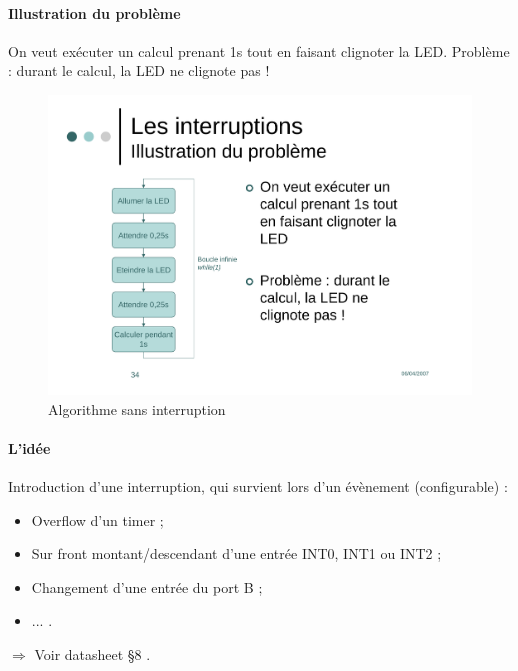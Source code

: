 \documentclass[a4paper]{article}
\begin{document}
\paragraph{Illustration du problème}

On veut exécuter un calcul prenant 1s tout en faisant clignoter la \ac{LED}. Problème : durant le calcul, la \ac{LED} ne clignote pas !

\begin{figure}[H]
	\centering
	\includegraphics[scale=0.60]{Images/Interruptions_probleme}
	\caption{Algorithme sans interruption
		\label{Interruptions_probleme}}
\end{figure}

\paragraph{L'idée}

Introduction d'une interruption, qui survient lors d'un évènement (configurable) :

\begin{itemize}
	\item Overflow d'un timer ;
	\item Sur front montant/descendant d'une entrée INT0, INT1 ou INT2 ;
	\item Changement d'une entrée du port B ;
	\item ... .
\end{itemize}

$\Rightarrow$ Voir datasheet §8 \cite{PIC18FXX2}.
\end{document}
